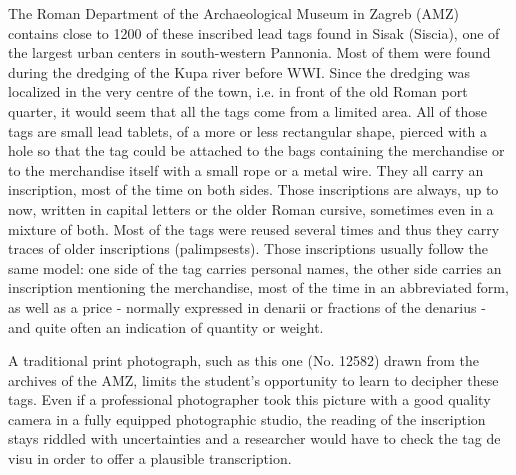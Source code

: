 \documentclass[amsthm,ebook]{saparticle}
\begin{document}
The Roman Department of the Archaeological Museum in Zagreb (AMZ) contains close to 1200 of these inscribed lead tags
found in Sisak (Siscia), one of the largest urban centers in south-western Pannonia. Most of them were found during the
dredging of the Kupa river before WWI. Since the dredging was localized in the very centre of the town, i.e. in front
of the old Roman port quarter, it would seem that all the tags come from a limited area. All of those tags are small
lead tablets, of a more or less rectangular shape, pierced with a hole so that the tag could be attached to the bags
containing the merchandise or to the merchandise itself with a small rope or a metal wire. They all carry an
inscription, most of the time on both sides. Those inscriptions are always, up to now, written in capital letters or
the older Roman cursive, sometimes even in a mixture of both. Most of the tags were reused several times and thus they
carry traces of older inscriptions (palimpsests). Those inscriptions usually follow the same model: one side of the tag
carries personal names, the other side carries an inscription mentioning the merchandise, most of the time in an
abbreviated form, as well as a price - normally expressed in denarii or fractions of the denarius - and quite often an
indication of quantity or weight.

A traditional print photograph, such as this one (No. 12582) drawn from the archives of the AMZ, limits the student’s
opportunity to learn to decipher these tags. Even if a professional photographer took this picture with a good quality
camera in a fully equipped photographic studio, the reading of the inscription stays riddled with uncertainties and a
researcher would have to check the tag de visu in order to offer a plausible transcription.
\end{document}
